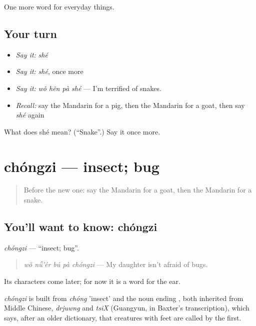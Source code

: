 \begin{grammarlens}[title={What you've built}]
One more word for everyday things.
\end{grammarlens}

\subsection*{Your turn}
\begin{itemize}
\raggedright
  \item \emph{Say it:} \emph{shé}
  \item \emph{Say it:} \emph{shé}, once more
  \item \emph{Say it:} \emph{wǒ hěn pà shé} — I'm terrified of snakes.
  \item \emph{Recall:} say the Mandarin for a pig, then the Mandarin for a goat, then say \emph{shé} again
\end{itemize}

\begin{tcolorbox}[breakable,colback=teal!4,colframe=teal!35!black,title={Before you move on}]
What does shé mean? (\textquotedblleft{}Snake\textquotedblright{}.) Say it once more.
\end{tcolorbox}
\section[chóngzi]{chóngzi — insect; bug}

\label{lesson:ZH-C242-chongzi}



\begin{quote}
Before the new one: say the Mandarin for a goat, then the Mandarin for a snake.
\end{quote}

\subsection*{You'll want to know: chóngzi}
\emph{chóngzi} — \textquotedblleft{}insect; bug\textquotedblright{}.

\begin{quote}
\emph{wǒ nǚ'ér bú pà chóngzi} — My daughter isn't afraid of bugs.
\end{quote}

Its characters come later; for now it is a word for the ear.

\begin{cousinweb}
\emph{chóngzi} is built from \emph{chóng} 'insect' and the noun ending , both inherited from Middle Chinese, \emph{drjuwng} and \emph{tsiX} (Guangyun, in Baxter's transcription), which says, after an older dictionary, that creatures with feet are called by the first.
\end{cousinweb}

